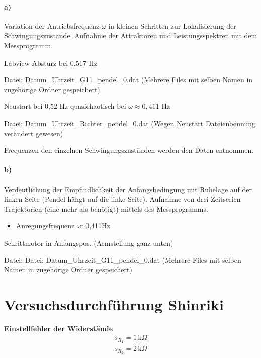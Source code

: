 \paragraph{a)}
Variation der Antriebsfrequenz $\omega$ in kleinen Schritten zur Lokalisierung der Schwingungszustände. Aufnahme der Attraktoren und Leistungsspektren mit dem Messprogramm.

Labview Absturz bei 0,517 Hz 

Datei: Datum\_Uhrzeit\_G11\_pendel\_0.dat (Mehrere Files mit selben Namen in zugehörige Ordner gespeichert)

Neustart bei 0,52 Hz
quasichaotisch bei $\omega\approx0,411$ Hz

Datei: Datum\_Uhrzeit\_Richter\_pendel\_0.dat (Wegen Neustart Dateienbennung verändert gewesen)

Frequenzen den einzelnen Schwingungszuständen werden den Daten entnommen.

\paragraph{b)}
Verdeutlichung der Empfindlichkeit der Anfangsbedingung mit Ruhelage auf der linken Seite (Pendel hängt auf die linke Seite). Aufnahme von drei Zeitserien Trajektorien (eine mehr als benötigt) mittels des Messprogramms.
\begin{itemize}
    \item Anregungsfrequenz $\omega$: 0,411Hz
\end{itemize}
Schrittmotor in Anfangspos. (Armstellung ganz unten)

Datei: Datei: Datum\_Uhrzeit\_G11\_pendel\_0.dat (Mehrere Files mit selben Namen in zugehörige Ordner gespeichert)

\section{Versuchsdurchführung Shinriki}
\label{sec:versuchShin}

\textbf{Einstellfehler der Widerstände}
\begin{align}
    s_{R_1} = 1\, \text{k}\Omega \\
    s_{R_2} = 2\, \text{k}\Omega
\end{align}


